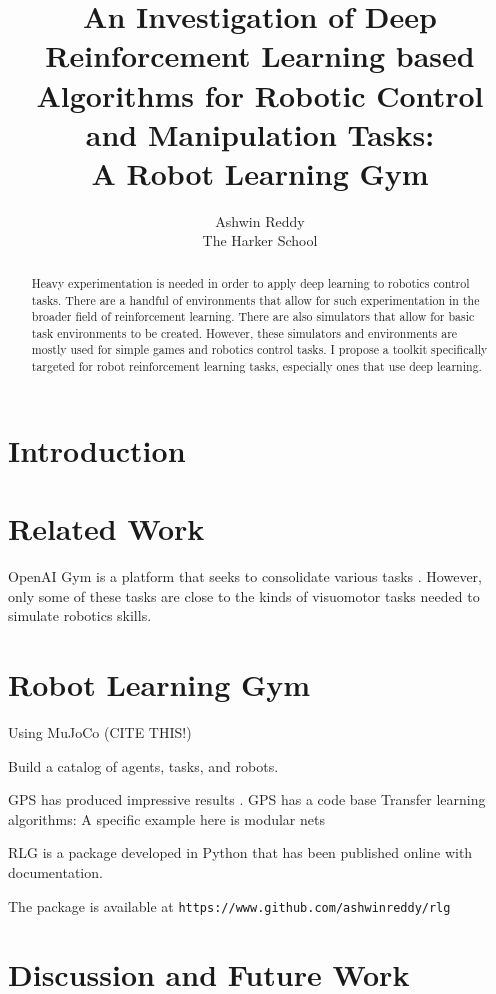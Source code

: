 \documentclass[12pt]{article}
\title{An Investigation of Deep Reinforcement Learning based Algorithms for Robotic Control and Manipulation Tasks:\\ A Robot Learning Gym}
\author{Ashwin Reddy  \\
	The Harker School
	}
\begin{document}
\maketitle

\begin{abstract}
    Heavy experimentation is needed in order to apply deep learning to robotics control tasks. There are a handful of environments that allow for such experimentation in the broader field of reinforcement learning. There are also simulators that allow for basic task environments to be created. However, these simulators and environments are mostly used for simple games and robotics control tasks. I propose a toolkit specifically targeted for robot reinforcement learning tasks, especially ones that use deep learning.
\end{abstract}


\section{Introduction}
\paragraph{}
\section{Related Work}
OpenAI Gym is a platform that seeks to consolidate various tasks \cite{1606.01540}. However, only some of these tasks are close to the kinds of visuomotor tasks needed to simulate robotics skills.

\section{Robot Learning Gym}
Using MuJoCo (CITE THIS!)

Build a catalog of agents, tasks, and robots.

GPS has produced impressive results \cite{lfda-e2e-15}.
GPS has a code base \cite{fzftm-gpsi-16}
Transfer learning algorithms:
A specific example here is modular nets \cite{DBLP:journals/corr/DevinGDAL16}

RLG is a package developed in Python that has been published online with documentation.

The package is available at \texttt{https://www.github.com/ashwinreddy/rlg}
\section{Discussion and Future Work}





\end{document}

